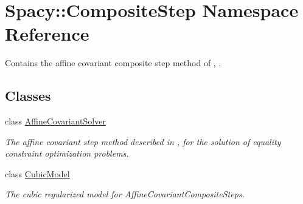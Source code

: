 \hypertarget{namespaceSpacy_1_1CompositeStep}{}\section{Spacy\+:\+:Composite\+Step Namespace Reference}
\label{namespaceSpacy_1_1CompositeStep}


Contains the affine covariant composite step method of \cite{Lubkoll2015}, \cite{Lubkoll2015a}.  


\subsection*{Classes}
\begin{DoxyCompactItemize}
\item 
class \hyperlink{classSpacy_1_1CompositeStep_1_1AffineCovariantSolver}{Affine\+Covariant\+Solver}
\begin{DoxyCompactList}\small\item\em The affine covariant step method described in \cite{Lubkoll2015}, \cite{Lubkoll2015a} for the solution of equality constraint optimization problems. \end{DoxyCompactList}\item 
class \hyperlink{classSpacy_1_1CompositeStep_1_1CubicModel}{Cubic\+Model}
\begin{DoxyCompactList}\small\item\em The cubic regularized model for Affine\+Covariant\+Composite\+Steps. \end{DoxyCompactList}\end{DoxyCompactItemize}

